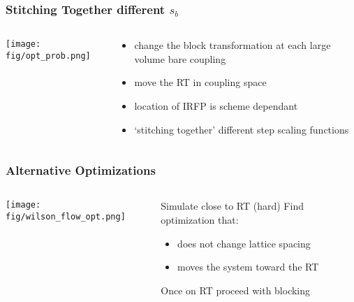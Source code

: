 \documentclass{beamer}
\begin{document}
  \begin{frame}
    \frametitle{Stitching Together different $s_b$}
    \begin{columns}[T]
      \begin{column}{.5\textwidth}
        \begin{block}{}
          \texttt{[image: fig/opt\_prob.png]}
        \end{block}
      \end{column}
      \begin{column}{.5\textwidth}
        \begin{block}{}
          \begin{itemize}
            \item change the block transformation at each large volume bare coupling
            \item move the RT in coupling space
            \item location of IRFP is scheme dependant
            \item `stitching together' different step scaling functions
          \end{itemize}
        \end{block}
      \end{column}
    \end{columns}
  \end{frame}

  \begin{frame}
    \frametitle{Alternative Optimizations}
    \begin{columns}[T]
      \begin{column}{.4\textwidth}
        \begin{block}{}
          \texttt{[image: fig/wilson\_flow\_opt.png]}
        \end{block}
      \end{column}
      \begin{column}{.6\textwidth}
        \begin{block}{}
          Simulate close to RT (hard)\newline
          Find optimization that:
          \begin{itemize}
            \item does not change lattice spacing
            \item moves the system toward the RT
          \end{itemize}
          Once on RT proceed with blocking
        \end{block}
      \end{column}
    \end{columns}
  \end{frame}
\end{document}
